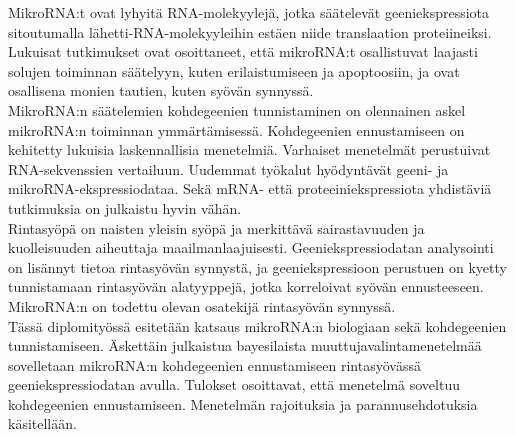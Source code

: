 \documentclass[english,12pt,a4paper,pdftex,elec,utf8]{aaltothesis}
\begin{document}
\professorship{--}
\begin{abstractpage}[finnish]

MikroRNA:t ovat lyhyitä RNA-molekyylejä, jotka säätelevät geeniekspressiota
sitoutumalla lähetti-RNA-molekyyleihin estäen niide translaation
proteiineiksi. Lukuisat tutkimukset ovat osoittaneet, että mikroRNA:t
osallistuvat laajasti solujen toiminnan säätelyyn, kuten erilaistumiseen ja
apoptoosiin, ja ovat osallisena monien tautien, kuten syövän synnyssä. \\

MikroRNA:n säätelemien kohdegeenien tunnistaminen on olennainen
askel mikroRNA:n toiminnan ymmärtämisessä. Kohdegeenien
ennustamiseen on kehitetty lukuisia laskennallisia menetelmiä. Varhaiset
menetelmät perustuivat RNA-sekvenssien vertailuun. Uudemmat työkalut
hyödyntävät geeni- ja mikroRNA-ekspressiodataa. Sekä mRNA- että
proteeiniekspressiota yhdistäviä tutkimuksia on julkaistu hyvin vähän. \\

Rintasyöpä on naisten yleisin syöpä ja merkittävä sairastavuuden ja
kuolleisuuden aiheuttaja maailmanlaajuisesti. Geeniekspressiodatan analysointi
on lisännyt tietoa rintasyövän synnystä, ja geeniekspressioon perustuen on
kyetty tunnistamaan rintasyövän alatyyppejä, jotka korreloivat syövän
ennusteeseen. MikroRNA:n on todettu olevan osatekijä rintasyövän synnyssä. \\

Tässä diplomityössä esitetään katsaus mikroRNA:n biologiaan sekä kohdegeenien
tunnistamiseen. Äskettäin julkaistua bayesilaista muuttujavalintamenetelmää
sovelletaan mikroRNA:n kohdegeenien ennustamiseen rintasyövässä
geeniekspressiodatan avulla. Tulokset osoittavat, että menetelmä soveltuu
kohdegeenien ennustamiseen. Menetelmän rajoituksia ja parannusehdotuksia
käsitellään.

\end{abstractpage}
\end{document}
